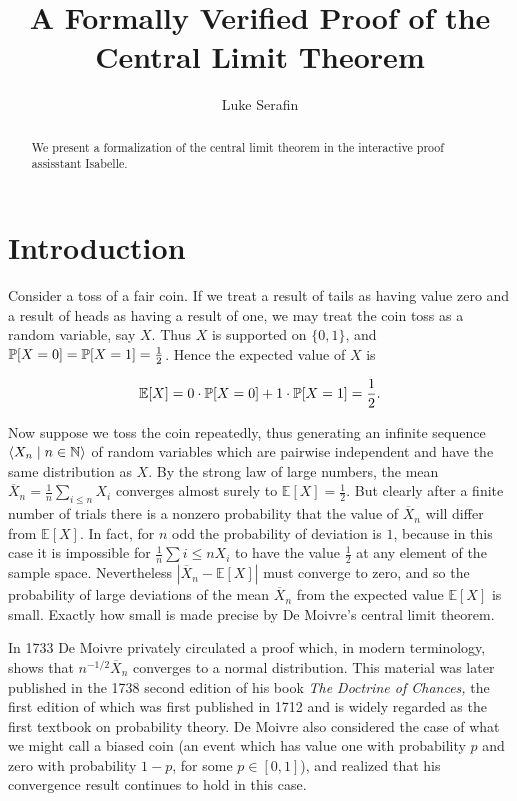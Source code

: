 \documentclass{article}
\title{A Formally Verified Proof of the Central Limit Theorem}
\author{Luke Serafin}
\theoremstyle{definition}
\newcommand{\bldseq}[2]{\langle{#1}\mid{#2}\rangle}
\renewcommand{\E}{\mathbb E}
\begin{document}
\maketitle

\begin{abstract}
We present a formalization of the central limit theorem in the interactive proof assisstant Isabelle.
\end{abstract}

\section{Introduction}

Consider a toss of a fair coin. If we treat a result of tails as having value zero and a result of heads as having a result of one, we may treat the coin toss as a random variable, say $X$. Thus $X$ is supported on $\{0,1\}$, and $\P[X = 0] = \P[X = 1] = \frac{1}{2}$. Hence the expected value of $X$ is

\[ \E[X] = 0 \cdot \P[X = 0] + 1 \cdot \P[X = 1] = \frac{1}{2}. \]

Now suppose we toss the coin repeatedly, thus generating an infinite sequence $\bldseq{X_n}{n \in \N}$ of random variables which are pairwise independent and have the same distribution as $X$. By the strong law of large numbers, the mean $\overline X_n = \frac{1}{n} \sum_{i \le n} X_i$ converges almost surely to $\E[X] = \frac{1}{2}$. But clearly after a finite number of trials there is a nonzero probability that the value of $\overline X_n$ will differ from $\E[X]$. In fact, for $n$ odd the probability of deviation is $1$, because in this case it is impossible for $\frac{1}{n} \sum{i \le n} X_i$ to have the value $\frac{1}{2}$ at any element of the sample space. Nevertheless $|\overline X_n - \E[X]|$ must converge to zero, and so the probability of large deviations of the mean $\overline X_n$ from the expected value $\E[X]$ is small. Exactly how small is made precise by De Moivre's central limit theorem.

In 1733 De Moivre privately circulated a proof which, in modern terminology, shows that $n^{-1/2} \overline X_n$ converges to a normal distribution. This material was later published in the 1738 second edition of his book {\em The Doctrine of Chances,} the first edition of which was first published in 1712 and is widely regarded as the first textbook on probability theory. De Moivre also considered the case of what we might call a biased coin (an event which has value one with probability $p$ and zero with probability $1-p$, for some $p \in [0,1]$), and realized that his convergence result continues to hold in this case.
\end{document}

